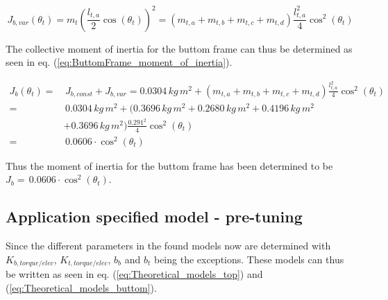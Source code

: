 \documentclass[../../main]{subfiles}
\begin{document}
\begin{equation}
  \label{eq:triangleDiagram_moment_of_inertia}
  J_{b,var}(\theta_t) = m_{t} \left( \frac{l_{t,a}}{2} \cos(\theta_t) \right)^2 = ( m_{t,a} + m_{t,b} + m_{t,c} + m_{t,d} ) \frac{l_{t,a}^2}{4} \cos^2(\theta_t)
\end{equation}

The collective moment of inertia for the buttom frame can thus be determined as seen in eq. (\ref{eq:ButtomFrame_moment_of_inertia}).

\begin{equation}
  \label{eq:ButtomFrame_moment_of_inertia}
\begin{split}
    J_{b}(\theta_t) =& \, J_{b,const} + J_{b,var} = 0.0304 \si{\, kg \, m^2} + ( m_{t,a} + m_{t,b} + m_{t,c} + m_{t,d} ) \frac{l_{t,a}^2}{4} \cos^2(\theta_t)\\
    =& \, 0.0304 \si{\, kg \, m^2} + ( 0.3696 \si{\, kg \, m^2} + 0.2680 \si{\, kg \, m^2} + 0.4196 \si{\, kg \, m^2}\\
    &+ 0.3696 \si{\, kg \, m^2})\frac{0.291^2}{4}\cos^2(\theta_t)\\
    =& \, 0.0606\cdot \cos^2(\theta_t)
\end{split}
\end{equation}

Thus the moment of inertia for the buttom frame has been determined to be
\newline $J_{b} = \, 0.0606 \cdot \cos^2(\theta_t)$.

\subsection{Application specified model - pre-tuning}
Since the different parameters in the found models now are determined with $K_{b,torque/elec}$, $K_{t,torque/elec}$, $b_b$ and $b_t$ being the exceptions. These models can thus be written as seen in eq. (\ref{eq:Theoretical_models_top}) and (\ref{eq:Theoretical_models_buttom}).
\end{document}

